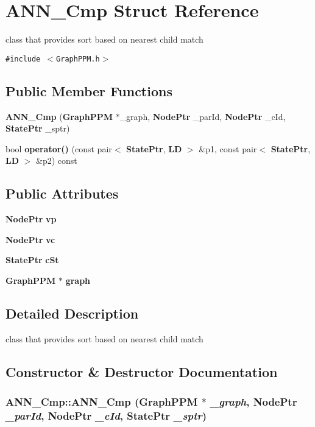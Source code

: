 \section{ANN\_\-Cmp Struct Reference}
\label{structANN__Cmp}
class that provides sort based on nearest child match  


{\tt \#include $<$GraphPPM.h$>$}

\subsection*{Public Member Functions}
\begin{CompactItemize}
\item 
{\bf ANN\_\-Cmp} ({\bf GraphPPM} $\ast$\_\-graph, {\bf NodePtr} \_\-parId, {\bf NodePtr} \_\-cId, {\bf StatePtr} \_\-sptr)
\item 
bool {\bf operator()} (const pair$<$ {\bf StatePtr}, {\bf LD} $>$ \&p1, const pair$<$ {\bf StatePtr}, {\bf LD} $>$ \&p2) const
\end{CompactItemize}
\subsection*{Public Attributes}
\begin{CompactItemize}
\item 
{\bf NodePtr} {\bf vp}
\item 
{\bf NodePtr} {\bf vc}
\item 
{\bf StatePtr} {\bf cSt}
\item 
{\bf GraphPPM} $\ast$ {\bf graph}
\end{CompactItemize}


\subsection{Detailed Description}
class that provides sort based on nearest child match 



\subsection{Constructor \& Destructor Documentation}
\subsubsection{\setlength{\rightskip}{0pt plus 5cm}ANN\_\-Cmp::ANN\_\-Cmp ({\bf GraphPPM} $\ast$ {\em \_\-graph}, {\bf NodePtr} {\em \_\-parId}, {\bf NodePtr} {\em \_\-cId}, {\bf StatePtr} {\em \_\-sptr})\hspace{0.3cm}{\tt  [inline]}}\label{structANN__Cmp_f0871048fff91268eac71d1cea33b186}





